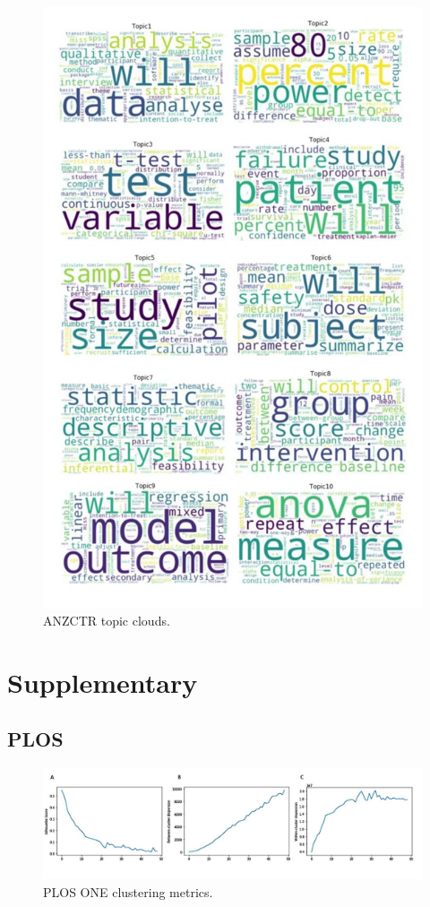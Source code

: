 \documentclass[12pt]{article}
\begin{document}
\begin{figure}

{\centering \includegraphics[width=0.7\linewidth]{figures/anzctr.wordclouds} 

}

\caption{ANZCTR topic clouds.}\label{fig:unnamed-chunk-7}
\end{figure}

\section{Supplementary}

\subsection{PLOS}

\begin{figure}

{\centering \includegraphics[width=1\linewidth]{figures/supplementary/supp_plosone.50clusters} 

}

\caption{PLOS ONE clustering metrics.}\label{fig:unnamed-chunk-8}
\end{figure}
\end{document}
